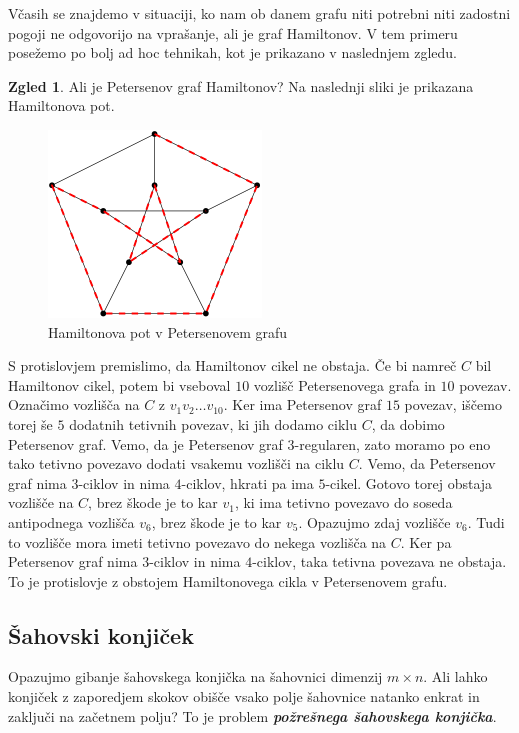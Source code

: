 \documentclass[11pt]{book}
\def\definicija{\color{rdeca}\bf\em}
\theoremstyle{definition}
\theoremstyle{zgled}
\newtheorem*{zgled}{Zgled}
\theoremstyle{odprtproblem}
\theoremstyle{domacanaloga}
\theoremstyle{izrek}
\begin{document}
Včasih se znajdemo v situaciji, ko nam ob danem grafu niti potrebni niti zadostni pogoji ne odgovorijo na vprašanje, ali je graf Hamiltonov. V tem primeru posežemo po bolj ad hoc tehnikah, kot je prikazano v naslednjem zgledu.

\begin{zgled}
    Ali je Petersenov graf Hamiltonov? Na naslednji sliki je prikazana Hamiltonova pot.

    \begin{figure}[h]
        \centering
        \includegraphics[width=0.25\linewidth]{img/grafi-petersen-hamilton-pot.png}
        \caption{Hamiltonova pot v Petersenovem grafu}
    \end{figure}     

    S protislovjem premislimo, da Hamiltonov cikel ne obstaja. Če bi namreč $C$ bil Hamiltonov cikel, potem bi vseboval $10$ vozlišč Petersenovega grafa in $10$ povezav. Označimo vozlišča na $C$ z $v_1v_2 \dots v_{10}$. Ker ima Petersenov graf $15$ povezav, iščemo torej še $5$ dodatnih tetivnih povezav, ki jih dodamo ciklu $C$, da dobimo Petersenov graf. Vemo, da je Petersenov graf $3$-regularen, zato moramo po eno tako tetivno povezavo dodati vsakemu vozlišči na ciklu $C$. Vemo, da Petersenov graf nima $3$-ciklov in nima $4$-ciklov, hkrati pa ima $5$-cikel. Gotovo torej obstaja vozlišče na $C$, brez škode je to kar $v_1$, ki ima tetivno povezavo do soseda antipodnega vozlišča $v_6$, brez škode je to kar $v_5$. Opazujmo zdaj vozlišče $v_6$. Tudi to vozlišče mora imeti tetivno povezavo do nekega vozlišča na $C$. Ker pa Petersenov graf nima $3$-ciklov in nima $4$-ciklov, taka tetivna povezava ne obstaja. To je protislovje z obstojem Hamiltonovega cikla v Petersenovem grafu.
\end{zgled}

\subsection{Šahovski konjiček}

Opazujmo gibanje šahovskega konjička na šahovnici dimenzij $m \times n$. Ali lahko konjiček z zaporedjem skokov obišče vsako polje šahovnice natanko enkrat in zaključi na začetnem polju? To je problem {\definicija požrešnega šahovskega konjička}. 
\end{document}
